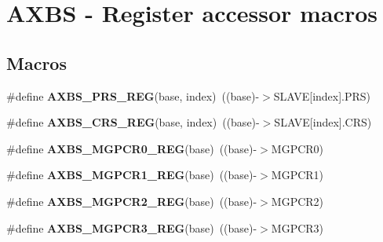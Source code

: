 \hypertarget{group__AXBS__Register__Accessor__Macros}{}\section{A\+X\+BS -\/ Register accessor macros}
\label{group__AXBS__Register__Accessor__Macros}
\subsection*{Macros}
\begin{DoxyCompactItemize}
\item 
\#define {\bfseries A\+X\+B\+S\+\_\+\+P\+R\+S\+\_\+\+R\+EG}(base,  index)~((base)-\/$>$S\+L\+A\+VE\mbox{[}index\mbox{]}.P\+RS)\hypertarget{group__AXBS__Register__Accessor__Macros_ga88215ff6f327312c2306aaf23da1ed6d}{}\label{group__AXBS__Register__Accessor__Macros_ga88215ff6f327312c2306aaf23da1ed6d}

\item 
\#define {\bfseries A\+X\+B\+S\+\_\+\+C\+R\+S\+\_\+\+R\+EG}(base,  index)~((base)-\/$>$S\+L\+A\+VE\mbox{[}index\mbox{]}.C\+RS)\hypertarget{group__AXBS__Register__Accessor__Macros_gaa30f55525640429154d1652859524832}{}\label{group__AXBS__Register__Accessor__Macros_gaa30f55525640429154d1652859524832}

\item 
\#define {\bfseries A\+X\+B\+S\+\_\+\+M\+G\+P\+C\+R0\+\_\+\+R\+EG}(base)~((base)-\/$>$M\+G\+P\+C\+R0)\hypertarget{group__AXBS__Register__Accessor__Macros_gac1b692121aae3307439d8a9c9bcfcf0a}{}\label{group__AXBS__Register__Accessor__Macros_gac1b692121aae3307439d8a9c9bcfcf0a}

\item 
\#define {\bfseries A\+X\+B\+S\+\_\+\+M\+G\+P\+C\+R1\+\_\+\+R\+EG}(base)~((base)-\/$>$M\+G\+P\+C\+R1)\hypertarget{group__AXBS__Register__Accessor__Macros_ga76506c532d79ae456a8c7bb93c2aaab5}{}\label{group__AXBS__Register__Accessor__Macros_ga76506c532d79ae456a8c7bb93c2aaab5}

\item 
\#define {\bfseries A\+X\+B\+S\+\_\+\+M\+G\+P\+C\+R2\+\_\+\+R\+EG}(base)~((base)-\/$>$M\+G\+P\+C\+R2)\hypertarget{group__AXBS__Register__Accessor__Macros_ga6aed791b752c5b45919a592387ac8886}{}\label{group__AXBS__Register__Accessor__Macros_ga6aed791b752c5b45919a592387ac8886}

\item 
\#define {\bfseries A\+X\+B\+S\+\_\+\+M\+G\+P\+C\+R3\+\_\+\+R\+EG}(base)~((base)-\/$>$M\+G\+P\+C\+R3)\hypertarget{group__AXBS__Register__Accessor__Macros_ga8fc8df6b6b79bf304bf85ace79194153}{}\label{group__AXBS__Register__Accessor__Macros_ga8fc8df6b6b79bf304bf85ace79194153}


\end{DoxyCompactItemize}
